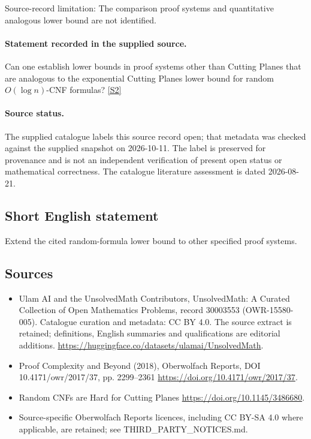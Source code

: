 \documentclass[11pt]{article}
\begin{document}
Source-record limitation: The comparison proof systems and quantitative analogous lower bound are not identified.
\paragraph{Statement recorded in the supplied source.}
Can one establish lower bounds in proof systems other than Cutting Planes that are analogous to the exponential Cutting Planes lower bound for random $O(\log n)$-CNF formulas? \href{https://doi.org/10.4171/owr/2017/37}{[S2]}
\paragraph{Source status.}
The supplied catalogue labels this source record open; that metadata was checked against the supplied snapshot on 2026-10-11. The label is preserved for provenance and is not an independent verification of present open status or mathematical correctness. The catalogue literature assessment is dated 2026-08-21.
\subsection{Short English statement}
Extend the cited random-formula lower bound to other specified proof systems.
\subsection{Sources}
\begin{itemize}
\item[S1] Ulam AI and the UnsolvedMath Contributors, UnsolvedMath: A Curated Collection of Open Mathematics Problems, record 30003553 (OWR-15580-005). Catalogue curation and metadata: CC BY 4.0. The source extract is retained; definitions, English summaries and qualifications are editorial additions.
\url{https://huggingface.co/datasets/ulamai/UnsolvedMath}.
\item[S2] Proof Complexity and Beyond (2018), Oberwolfach Reports, DOI 10.4171/owr/2017/37, pp. 2299--2361
\url{https://doi.org/10.4171/owr/2017/37}.
\item[S3] Random CNFs are Hard for Cutting Planes
\url{https://doi.org/10.1145/3486680}.
\item Source-specific Oberwolfach Reports licences, including CC BY-SA 4.0 where applicable, are retained; see THIRD\_PARTY\_NOTICES.md.
\end{itemize}
\end{document}
